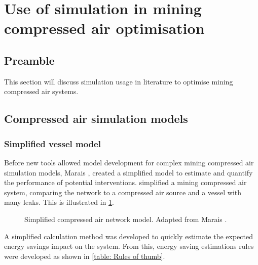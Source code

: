 \section{Use of simulation in mining compressed air optimisation}
\subsection{Preamble}
This section will discuss simulation usage in literature to optimise mining compressed air systems.
\subsection{Compressed air simulation models} \label{simplfiedModels}
\subsubsection{Simplified vessel  model}
Before new tools allowed model development for complex mining compressed air simulation models, Marais \cite{Marais2012PhD},\cite{marais2013simplification} created a simplified model to estimate and quantify the performance of potential interventions.  \cite{Marais2012PhD} simplified a mining compressed air system, comparing the network to a compressed air source and a vessel with many leaks. This is illustrated in \cref{fig:Marais vessel model}.
\begin{figure}[h!]
	\centering
	\caption[Simplified compressed air netowrk model.]{Simplified compressed air network model. Adapted from Marais \cite{Marais2012PhD}.}
	\label{fig:Marais vessel model}
\end{figure}
\par 
A simplified calculation method was developed to quickly estimate the expected energy savings impact on the system. From this, energy saving estimations rules were developed as shown in \cref{table: Rules of thumb}.  
